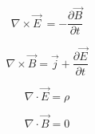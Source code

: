 \documentclass{article}
\begin{document}
\[\nabla \times \vec{E} \ = -\frac{\partial \vec{B}}{\partial t} \]

\[\nabla \times \vec{B}=\vec{j} +
\frac{\partial \vec{E}}{\partial t} \]

\[\nabla \cdot \vec{E} = \rho\]

\[\nabla \cdot \vec{B} = 0 \]
\end{document}
